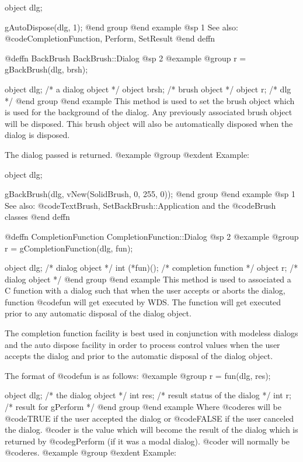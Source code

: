 object  dlg;

gAutoDispose(dlg, 1);
@end group
@end example
@sp 1
See also:  @code{CompletionFunction, Perform, SetResult}
@end deffn














@deffn {BackBrush} BackBrush::Dialog
@sp 2
@example
@group
r = gBackBrush(dlg, brsh);

object  dlg;    /*  a dialog object   */
object  brsh;   /*  brush object      */
object  r;      /*  dlg               */
@end group
@end example
This method is used to set the brush object which is used for the
background of the dialog.  Any previously associated brush object will
be disposed.  This brush object will also be automatically disposed when
the dialog is disposed.

The dialog passed is returned.
@example
@group
@exdent Example:

object  dlg;

gBackBrush(dlg, vNew(SolidBrush, 0, 255, 0));
@end group
@end example
@sp 1
See also:  @code{TextBrush, SetBackBrush::Application}
        and the @code{Brush} classes
@end deffn










@deffn {CompletionFunction} CompletionFunction::Dialog
@sp 2
@example
@group
r = gCompletionFunction(dlg, fun);

object  dlg;       /*  dialog object        */
int     (*fun)();  /*  completion function  */
object  r;         /*  dialog object        */
@end group
@end example
This method is used to associated a C function with a dialog such that
when the user accepts or aborts the dialog, function @code{fun} will
get executed by WDS.  The function will get executed prior to any automatic
disposal of the dialog object.

The completion function facility is best used in conjunction with
modeless dialogs and the auto dispose facility in order to process
control values when the user accepts the dialog and prior to the
automatic disposal of the dialog object.

The format of @code{fun} is as follows:
@example
@group
r = fun(dlg, res);

object  dlg;    /*  the dialog object  */
int     res;    /*  result status of the dialog  */
int     r;      /*  result for gPerform  */
@end group
@end example
Where @code{res} will be @code{TRUE} if the user accepted the dialog or
@code{FALSE} if the user canceled the dialog.  @code{r} is the value
which will become the result of the dialog which is returned by @code{gPerform}
(if it was a modal dialog).  @code{r} will normally be @code{res}.
@example
@group
@exdent Example:

